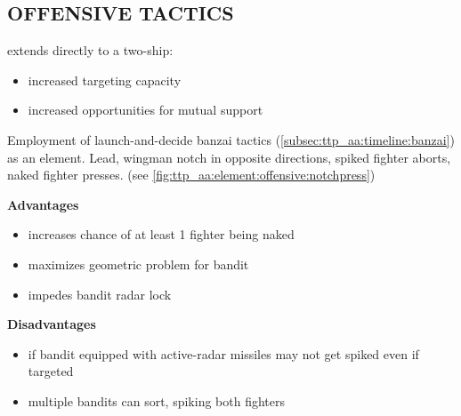 
\subsection{OFFENSIVE TACTICS}

\begin{tcoloritemize}
     extends directly to a two-ship:
    \begin{itemize}
        \item increased targeting capacity
        \item increased opportunities for mutual support
    \end{itemize}

    Employment of launch-and-decide banzai tactics (\cref{subsec:ttp_aa:timeline:banzai})
    as an element. Lead, wingman notch in opposite directions, 
    spiked fighter aborts, 
    naked fighter presses.
    \hfill(see \cref{fig:ttp_aa:element:offensive:notchpress})

    \bigskip
    \textbf{Advantages}
    \begin{itemize}
        \item increases chance of at least 1 fighter being naked
        \item maximizes geometric problem for bandit
        \item impedes bandit radar lock
    \end{itemize}

    \textbf{Disadvantages}
    \begin{itemize}
        \item if bandit equipped with active-radar missiles may not get spiked even if targeted
        \item multiple bandits can sort, spiking both fighters
    \end{itemize}
\end{tcoloritemize}

